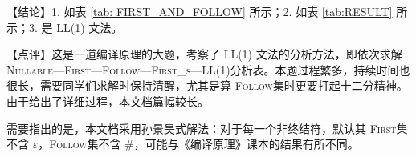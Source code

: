 \documentclass[UTF8]{ctexart}
\newcommand\FIRST{\textsc{First}}
\newcommand\FOLLOW{\textsc{Follow}}
\newcommand\NULLABLE{\textsc{Nullable}}
\newcommand\FIRSTS{\textsc{First\_s}}
\begin{document}
\BgThispage
\vspace{1em}
{\color{cyan!80!black}
【结论】1. 如表 \ref{tab: FIRST_AND_FOLLOW} 所示；2. 如表 \ref{tab:RESULT} 所示；3. 是 LL(1) 文法。

【点评】这是一道编译原理的大题，考察了 LL(1) 文法的分析方法，即依次求解 \NULLABLE—\FIRST—\FOLLOW—\FIRSTS—LL(1)分析表。本题过程繁多，持续时间也很长，需要同学们求解时保持清醒，尤其是算 \FOLLOW 集时更要打起十二分精神。由于给出了详细过程，本文档篇幅较长。

需要指出的是，本文档采用孙景昊式解法：对于每一个非终结符，默认其 \FIRST 集不含 $\varepsilon$，\FOLLOW 集不含 $\#$，可能与《编译原理》课本的结果有所不同。
}
\end{document}
